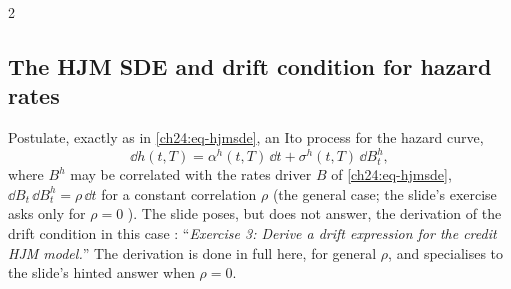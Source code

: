 \begin{paracol}{2}
\subsection{The HJM SDE and drift condition for hazard rates}
Postulate, exactly as in \eqref{ch24:eq-hjmsde}, an Ito process for the hazard curve,
\begin{equation}\label{ch24:eq-hjmcredit}
  \dd h(t,T)=\alpha^h(t,T)\,\dd t+\sigma^h(t,T)\,\dd B^h_t ,
\end{equation}
 where $B^h$ may be correlated with the rates driver $B$ of \eqref{ch24:eq-hjmsde}, $\dd B_t\,\dd B^h_t=\rho\,\dd t$ for a constant correlation $\rho$ (the general case; the slide's exercise asks only for $\rho=0$ ). The slide poses, but does not answer, the derivation of the drift condition in this case : ``\emph{Exercise 3: Derive a drift expression for the credit HJM model.}'' The derivation is done in full here, for general $\rho$, and specialises to the slide's hinted answer when $\rho=0$.


\end{paracol}
